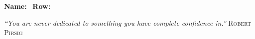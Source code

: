 \documentclass[12pt,fleqn]{exam}
\begin{document}
\newcommand{\reals}{\mathbf{R}}
\newcommand{\bi}{\mathbf{i}}
\newcommand{\bj}{\mathbf{j}}
\newcommand{\bk}{mathbf{k}}

\newcommand{\euler}{\mathrm{e}}
\newcommand{\ex}{1}
\newenvironment{alphalist}{
  \begin{enumerate}[(a)]
    \addtolength{\itemsep}{-1.0\itemsep}}
  {\end{enumerate}}

\newenvironment{handlist}{
  \begin{enumerate}[\leftthumbsup]
    \addtolength{\itemsep}{-1.0\itemsep}}
  {\end{enumerate}}

\vspace{0.1in}
\noindent{}
{\bf Name:}\hrulefill\
\noindent {}
{\bf Row:}\hrulefill\


\noindent \emph{“You are never dedicated to something you have complete confidence in.''} \hfill  \textsc{Robert Pirsig}
\end{document}
